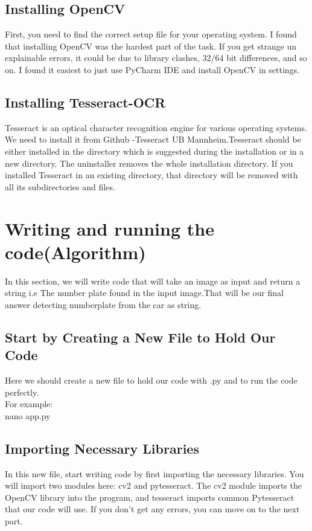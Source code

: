 \documentclass[12pt,a4paper]{report}
\begin{document}
\subsection{Installing OpenCV}
First, you need to find the correct setup file for your operating system.
I found that installing OpenCV was the hardest part of the task. If you get strange un explainable errors, it could be due to library clashes, 32/64 bit differences, and so on. I found it easiest to just use PyCharm IDE and install OpenCV in settings.\\

\subsection{Installing Tesseract-OCR}
Tesseract is an optical character recognition engine for various operating systems. We need to install it from Github -Tesseract UB Mannheim.Tesseract should be either installed in the directory which is suggested during the installation or in a new directory. The uninstaller removes the whole installation directory. If you installed Tesseract in an existing directory, that directory will be removed with all its subdirectories and files.

\section{Writing and running the code(Algorithm)}
In this section, we will write code that will take an image as input and return a string i.e The number plate found in the input image.That will be our final answer detecting numberplate from the car as string.\\
 \subsection{Start by Creating a New File to Hold Our Code}
Here we should create a new file to hold our code with .py
and to run the code perfectly.\\
For example:\\

nano app.py
\subsection{Importing  Necessary Libraries}
In this new file, start writing code by first importing the necessary libraries. You will import two modules here: cv2 and pytesseract. The cv2 module imports the OpenCV library into the program, and tesseract imports common Pytesseract that our code will use.
If you don’t get any errors, you can move on to the next part.
\end{document}
